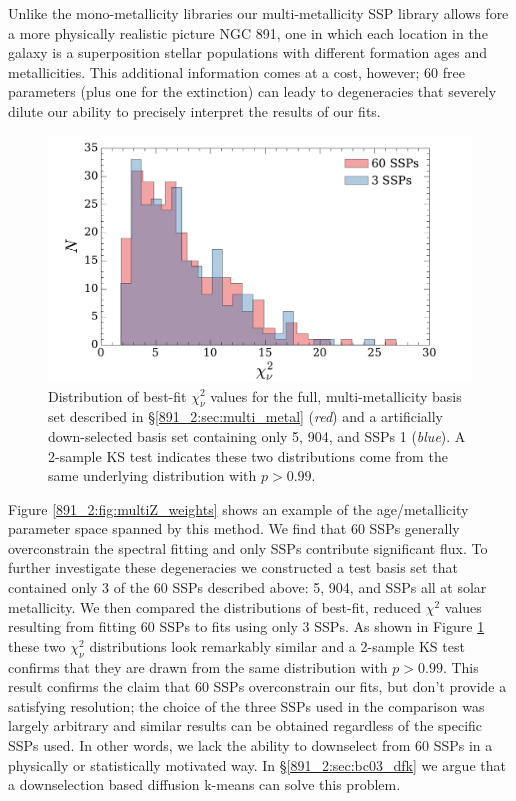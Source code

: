 Unlike the mono-metallicity libraries our multi-metallicity SSP
library allows fore a more physically realistic picture NGC 891, one
in which each location in the galaxy is a superposition stellar
populations with different formation ages and metallicities. This
additional information comes at a cost, however; 60 free parameters
(plus one for the extinction) can leady to degeneracies that severely
dilute our ability to precisely interpret the results of our fits.

\begin{figure}
  \centering
  \includegraphics[width=\columnwidth]{891_2/figs/allz_chihist.pdf}
  \caption[$\chi_{\nu}^2$ distribution for 61 and 4 parameter
    fits]{\fixspacing\label{891_2:fig:3SSP_chi}Distribution of
    best-fit $\chi^2_\nu$ values for the full, multi-metallicity basis
    set described in \S\ref{891_2:sec:multi_metal} (\emph{red}) and a
    artificially down-selected basis set containing only 5, 904, and
     SSPs 1 \Zsol (\emph{blue}). A 2-sample KS test
    indicates these two distributions come from the same underlying
    distribution with $p > 0.99$.}
\end{figure}

Figure \ref{891_2:fig:multiZ_weights} shows an example of the
age/metallicity parameter space spanned by this method. We find that
60 SSPs generally overconstrain the spectral fitting and only 
SSPs contribute significant flux. To further investigate these
degeneracies we constructed a test basis set that contained only 3 of
the 60 SSPs described above: 5, 904, and  SSPs all at
solar metallicity. We then compared the distributions of best-fit,
reduced $\chi^2$ values resulting from fitting 60 SSPs to fits using
only 3 SSPs. As shown in Figure \ref{891_2:fig:3SSP_chi} these two
$\chi^2_\nu$ distributions look remarkably similar and a 2-sample KS
test confirms that they are drawn from the same distribution with $p >
0.99$. This result confirms the claim that 60 SSPs overconstrain our
fits, but don't provide a satisfying resolution; the choice of the
three SSPs used in the comparison was largely arbitrary and similar
results can be obtained regardless of the specific SSPs used. In other
words, we lack the ability to downselect from 60 SSPs in a physically
or statistically motivated way. In \S\ref{891_2:sec:bc03_dfk} we argue that
a downselection based diffusion k-means can solve this problem.


